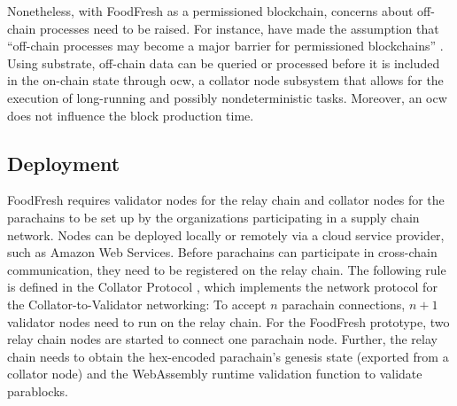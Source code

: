 \documentclass[conference,a4paper,flushend]{neutr}
\begin{document}
Nonetheless, with FoodFresh as a permissioned blockchain, concerns about off-chain processes need to be raised. For instance, \citeauthor{HELLIAR2020102136} have made the assumption that ``off-chain processes may become a major barrier for permissioned blockchains'' \cite{HELLIAR2020102136}. Using substrate, off-chain data can be queried or processed before it is included in the on-chain state through \ac{ocw}, a collator node subsystem that allows for the execution of long-running and possibly nondeterministic tasks. Moreover, an \ac{ocw} does not influence the block production time.

\subsection{Deployment} \label{s:deployment}
FoodFresh requires validator nodes for the relay chain and collator nodes for the parachains to be set up by the organizations participating in a supply chain network. Nodes can be deployed locally or remotely via a cloud service provider, such as Amazon Web Services. 
Before parachains can participate in cross-chain communication, they need to be registered on the relay chain. The following rule is defined in the Collator Protocol \cite{collatorProtocol}, which implements the network protocol for the Collator-to-Validator networking: To accept $n$ parachain connections, $n + 1$ validator nodes need to run on the relay chain. For the FoodFresh prototype, two relay chain nodes are started to connect one parachain node. Further, the relay chain needs to obtain the hex-encoded parachain's genesis state (exported from a collator node) and the WebAssembly runtime validation function to validate parablocks.
\end{document}
